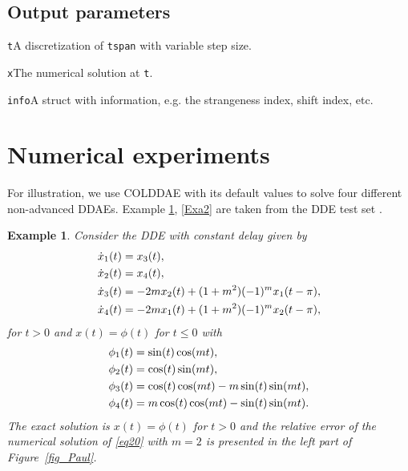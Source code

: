 \documentclass[final,reqno]{siamltex}
\renewenvironment{itemize}[1]{\begin{compactitem}#1}{\end{compactitem}}
\newtheorem{example}[theorem]{Example}
\begin{document}
\subsection{Output parameters}
\begin{itemize}
\item {\tt t}\quad A discretization of {\tt tspan} with variable step size.
\item {\tt x}\quad The numerical solution at {\tt t}.
\item {\tt info}\quad A struct with information, e.g. the strangeness index, shift index, etc.
\end{itemize}

\section{Numerical experiments}
For illustration, we use COLDDAE with its default values to solve four different non-advanced DDAEs.
Example \ref{Exa1}, \ref{Exa2} are taken from the DDE test set \cite{Pau94}.
%
\begin{example}\label{Exa1} {\rm Consider the DDE with constant delay given by
%
\bsq\label{eq20}
\begin{equation}\label{eq20a}
\bsp{
\dot{x}_1(t) & = x_3(t),\\
\dot{x}_2(t) & = x_4(t),\\
\dot{x}_3(t) & = -2mx_2(t)+(1+m^2)(-1)^mx_1(t-\pi),\\
\dot{x}_4(t) & = -2mx_1(t)+(1+m^2)(-1)^mx_2(t-\pi),
}
\end{equation}
for $t>0$ and $x(t)=\phi(t)$ for $t\leq 0$ with
\begin{equation}\label{eq20b}
\bsp{
{\phi}_1(t) & = \sin(t)\cos(mt),\\
{\phi}_2(t) & = \cos(t)\sin(mt),\\
{\phi}_3(t) & = \cos(t)\cos(mt)-m\sin(t)\sin(mt),\\
{\phi}_4(t) & =m\cos(t)\cos(mt)-\sin(t)\sin(mt).
}
\end{equation}
\esq
%
The exact  solution is $x(t)=\phi(t)$ for $t>0$ and the relative error of the numerical solution of \eqref{eq20} with $m=2$ is presented in the left part of Figure~\ref{fig_Paul}.
}
\end{example}
%
\end{document}
